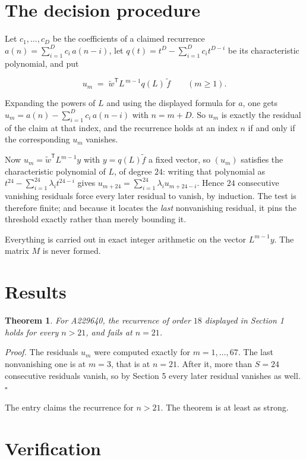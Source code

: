 \documentclass[11pt]{article}
\newtheorem{theorem}{Theorem}
\theoremstyle{definition}
\begin{document}
\section{The decision procedure}

Let $c_1,\dots,c_D$ be the coefficients of a claimed recurrence $a(n) = \sum_{i=1}^{D} c_i\,a(n-i)$, let $q(t) = t^{D} - \sum_{i=1}^{D} c_i t^{D-i}$ be its characteristic polynomial, and put

\[u_m \;=\; \tilde w^{\mathsf T} L^{\,m-1} q(L)\,\tilde f \qquad (m \ge 1).\]

Expanding the powers of $L$ and using the displayed formula for $a$, one gets $u_m = a(n) - \sum_{i=1}^{D} c_i\,a(n-i)$ with $n = m + D$. So $u_m$ is exactly the residual of the claim at that index, and the recurrence holds at an index $n$ if and only if the corresponding $u_m$ vanishes.

Now $u_m = \tilde w^{\mathsf T} L^{m-1} y$ with $y = q(L)\tilde f$ a fixed vector, so $(u_m)$ satisfies the characteristic polynomial of $L$, of degree $24$: writing that polynomial as $t^{24} - \sum_{i=1}^{24} \lambda_i t^{24-i}$ gives $u_{m+24} = \sum_{i=1}^{24} \lambda_i u_{m+24-i}$. Hence $24$ consecutive vanishing residuals force every later residual to vanish, by induction. The test is therefore finite; and because it locates the {\itshape last} nonvanishing residual, it pins the threshold exactly rather than merely bounding it.

Everything is carried out in exact integer arithmetic on the vector $L^{m-1}y$. The matrix $M$ is never formed.

\section{Results}

\begin{theorem} For A229640, the recurrence of order $18$ displayed in Section 1 holds for every $n > 21$, and fails at $n = 21$.\end{theorem}

{\itshape Proof.} The residuals $u_m$ were computed exactly for $m = 1,\dots,67$. The last nonvanishing one is at $m = 3$, that is at $n = 21$. After it, more than $S = 24$ consecutive residuals vanish, so by Section 5 every later residual vanishes as well. $\square$

The entry claims the recurrence for $n > 21$. The theorem is at least as strong.

\section{Verification}
\end{document}
